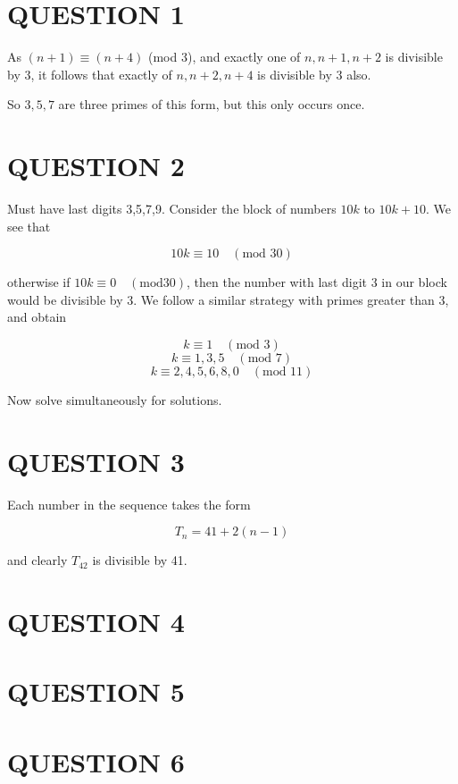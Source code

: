 \documentclass[a4paper]{article}
\begin{document}
	
\maketitle

\section{QUESTION 1}

As $ (n+1) \equiv (n+4) $ (mod 3), and exactly one of $ n,n+1,n+2 $ is divisible by 3, it follows that exactly of $ n, n+2,n+4 $ is divisible by 3 also.

So $ 3,5,7 $ are three primes of this form, but this only occurs once.

\section{QUESTION 2}

Must have last digits 3,5,7,9.
Consider the block of numbers $ 10k  $ to $ 10k + 10 $.
We see that

\[ 10k \equiv 10 \quad (\text{mod } 30) \]

otherwise if $   10k \equiv 0 \quad (\text{mod} 30)$, then the number with last digit 3 in our block would be divisible by 3. We follow a similar strategy with primes greater than 3, and obtain

\[ k \equiv 1 \quad  (\text{mod } 3) \]
\[ k \equiv 1, 3, 5 \quad  (\text{mod } 7) \]
\[ k \equiv 2, 4,5,6,8,0 \quad  (\text{mod } 11) \]

Now solve simultaneously for solutions.

\section{QUESTION 3}

Each number in the sequence takes the form

\[ T_{n} = 41 + 2(n-1)  \]

and clearly $ T_{42} $ is divisible by 41.

\section{QUESTION 4}




\section{QUESTION 5}
\section{QUESTION 6}
\end{document}
